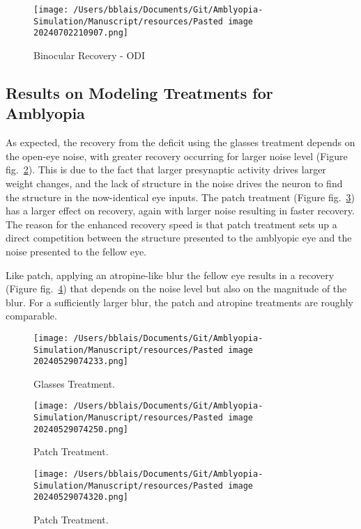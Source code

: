 \documentclass[
]{article}
\begin{document}
\begin{figure}
\centering
\texttt{[image: /Users/bblais/Documents/Git/Amblyopia-Simulation/Manuscript/resources/Pasted image 20240702210907.png]}
\caption{Binocular Recovery -
ODI}\label{fig:Pasted_image_20240702210907.png}
\end{figure}

\subsection{Results on Modeling Treatments for
Amblyopia}\label{sec:results-on-modeling-treatments-for-amblyopia}

As expected, the recovery from the deficit using the glasses treatment
depends on the open-eye noise, with greater recovery occurring for
larger noise level (Figure fig.~\ref{fig:glasses_treatment}). This is
due to the fact that larger presynaptic activity drives larger weight
changes, and the lack of structure in the noise drives the neuron to
find the structure in the now-identical eye inputs. The patch treatment
(Figure fig.~\ref{fig:patch_treatment}) has a larger effect on recovery,
again with larger noise resulting in faster recovery. The reason for the
enhanced recovery speed is that patch treatment sets up a direct
competition between the structure presented to the amblyopic eye and the
noise presented to the fellow eye.

Like patch, applying an atropine-like blur the fellow eye results in a
recovery (Figure fig.~\ref{fig:atropine_treatment}) that depends on the
noise level but also on the magnitude of the blur. For a sufficiently
larger blur, the patch and atropine treatments are roughly comparable.

\begin{figure}
\centering
\texttt{[image: /Users/bblais/Documents/Git/Amblyopia-Simulation/Manuscript/resources/Pasted image 20240529074233.png]}
\caption{Glasses Treatment.}\label{fig:glasses_treatment}
\end{figure}

\begin{figure}
\centering
\texttt{[image: /Users/bblais/Documents/Git/Amblyopia-Simulation/Manuscript/resources/Pasted image 20240529074250.png]}
\caption{Patch Treatment.}\label{fig:patch_treatment}
\end{figure}

\begin{figure}
\centering
\texttt{[image: /Users/bblais/Documents/Git/Amblyopia-Simulation/Manuscript/resources/Pasted image 20240529074320.png]}
\caption{Patch Treatment.}\label{fig:atropine_treatment}
\end{figure}
\end{document}
